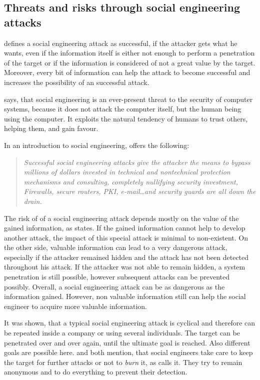 \subsection{Threats and risks through social engineering attacks}

\cite{thornburgh2004} defines a social engineering attack as successful, if the
attacker gets what he wants, even if the information itself is either not
enough to perform a penetration of the target or if the information is
considered of not a great value by the target. Moreover, every bit of
information can help the attack to become successful and increases the
possibility of an successful attack.

\cite{orgill2004} says, that social engineering is an ever-present threat to
the security of computer systems, because it does not attack the computer
itself, but the human being using the computer. It exploits the natural
tendency of humans to trust others, helping them, and gain favour.

In an introduction to social engineering, \cite{manske2000} offers the following:

\begin{quote}
\textit{Successful social engineering attacks give the attacker the means to bypass
millions of dollars invested in technical and nontechnical protection
mechanisms and consulting, completely nullifying security investment,
Firewalls, secure routers, PKI, e-mail\dots and security guards are all down
the drain.}
\end{quote}

The risk of of a social engineering attack depends mostly on the value of the
gained information, as \cite{thornburgh2004} states. If the gained information
cannot help to develop another attack, the impact of this special attack is
minimal to non-existent. On the other side, valuable information can lead to a
very dangerous attack, especially if the attacker remained hidden and the
attack has not been detected throughout his attack. If the attacker was not
able to remain hidden, a system penetration is still possible, however
subsequent attacks can be prevented possibly. Overall, a social engineering
attack can be as dangerous as the information gained. However, non valuable
information still can help the social engineer to acquire more valuable
information.

It was shown, that a typical social engineering attack is cyclical and
therefore can be repeated inside a company or using several individuals. The
target can be penetrated over and over again, until the ultimate goal is
reached. Also different goals are possible here. \cite{thornburgh2004} and
\cite{mitnick2003} both mention, that social engineers take care to keep the
target for further attacks or not to \textit{burn} it, as \cite{thornburgh2004}
calls it. They try to remain anonymous and to do everything to prevent their
detection.

